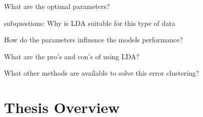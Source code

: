 What are the optimal parameters?

subquestions:
Why is LDA suitable for this type of data 

How do the parameters influence the models performance?

What are the pro's and con's of using LDA?

What other methods are available to solve this error clustering?



\begin{comment}

How do we define similair messages?

Can we cluster these error messages to find patterns?

Wat ik zou verwachten in je scriptie zijn de volgende topics
•	Wat is het probleem (de probleemstelling)?
•	Welke mogelijkheden zijn er om dit probleem op te lossen?
•	Welke methode heb je gekozen, en vooral uitleggen waarom deze methode volgens jou de beste is?
•	Hoe heb je vastgesteld dat de gekozen oplossing de beste is?
•	Wat is de uitkomst?
•	Wat zijn de voor en nadelen van het gekozen model, wat zijn de beperkingen, wat is de optimale modelering en waarom?
Zijn deze onderwerpen voldoende afgedicht in onderstaande structuur?

Ik ben veel meer geïnteresseerd in de onderbouwing:
•	Wat is de (onze) probleem omschrijving
Finding structures in syslogs to cluster undiscovered syslogs with errors
•	Waarom kies je LDA om dit probleem te lijf te gaan
o	Pro’s / con’s
o	Alternatieven
•	Hoe moet LDA gebruikt worden
o	Welke specifieke tuning heb je gebruikt
o	Hoe beinvloed de aanpassingen van parameters de uitkomst


\textbf{Can we make a reliable model for error detection in system logs?}

 \end{comment}
 
\section{Thesis Overview}

\begin{comment}
It is recommended to end the introduction with an overview of the thesis. This chapter contains the introduction; Chapter~\ref{ch:definitions} includes the definitions; Chapter~\ref{ch:relatedwork} discusses related work; Chapter~\ref{ch:evaluation} evaluates the contributions; Chapter~\ref{ch:conclusions} concludes.

Also make a nice sentence with ``bachelor thesis'', LIACS and the names of the supervisors.

\end{comment}